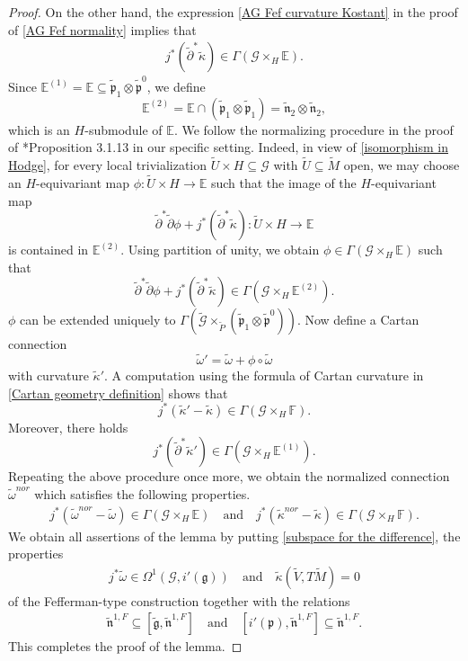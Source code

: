 \documentclass[11pt]{amsart}
\begin{document}
\begin{proof}
On the other hand, the expression \eqref{AG Fef curvature Kostant} in the proof of \cref{AG Fef normality} implies that
\begin{align}\label{space of nonnormality}    j^*(\tilde\partial^*\tilde\kappa)\in\Gamma(\mathcal G\times_{H}\mathbb E).
\end{align}
Since $\mathbb E^{(1)}=\mathbb E\subseteq\tilde{\mathfrak p}_1\otimes\tilde{\mathfrak p}^0$, we define 
\[\mathbb E^{(2)}=\mathbb E\cap(\tilde{\mathfrak p}_1\otimes\tilde{\mathfrak p}_1)=\tilde{\mathfrak n}_2\otimes\tilde{\mathfrak n}_2,\]
which is an $H$-submodule of $\mathbb E$. We follow the normalizing procedure in the proof of \cite{Book}*{Proposition 3.1.13} in our specific setting. Indeed, in view of \eqref{isomorphism in Hodge}, for every local trivialization $\tilde U\times H\subseteq\mathcal G$ with $\tilde U\subseteq\tilde M$ open, we may choose an $H$-equivariant map $\phi:\tilde U\times H\to\mathbb E$ such that the image of the $H$-equivariant map 
\[\tilde\partial^*\tilde\partial\phi
+j^*(\tilde\partial^*\tilde\kappa):
\tilde U\times H\to\mathbb E\]
is contained in $\mathbb E^{(2)}$. Using partition of unity, we obtain $\phi\in\Gamma(\mathcal G\times_H\mathbb E)$ such that
\[\tilde\partial^*\tilde\partial\phi
+j^*(\tilde\partial^*\tilde\kappa)\in\Gamma(\mathcal G\times_H\mathbb E^{(2)}).\]
$\phi$ can be extended uniquely to $\Gamma(\tilde{\mathcal G}\times_{\tilde P}(\tilde{\mathfrak p}_1\otimes\tilde{\mathfrak p}^0))$. Now define a Cartan connection
\[\tilde\omega'=\tilde\omega+\phi\circ\tilde\omega\] with curvature $\tilde\kappa'$. A computation using the formula of Cartan curvature in \cref{Cartan geometry definition} shows that
\[j^*(\tilde\kappa'-\tilde\kappa)\in\Gamma(\mathcal G\times_H\mathbb F).\]
Moreover, there holds
\[j^*(\tilde\partial^*\tilde\kappa')\in\Gamma(\mathcal G\times_H\mathbb E^{(1)}).\]
Repeating the above procedure once more, we obtain the normalized connection $\tilde\omega^{nor}$ which satisfies the following properties. 
\begin{align}\label{subspace for the difference}
j^*(\tilde\omega^{nor}-\tilde\omega)\in\Gamma(\mathcal G\times_H\mathbb E)
\quad\text{and}\quad
j^*(\tilde\kappa^{nor}-\tilde\kappa)\in\Gamma(\mathcal G\times_H\mathbb F).
\end{align}
We obtain all assertions of the lemma by putting \eqref{subspace for the difference}, the properties
\begin{align*}
j^*\tilde\omega\in\Omega^1(\mathcal G,i'(\mathfrak g))
\quad\text{and}\quad
\tilde\kappa(\tilde V,T\tilde M)=0    
\end{align*}
of the Fefferman-type construction together with the relations
\begin{align*}
   \tilde{\mathfrak n}^{1,F}\subseteq [\tilde{\mathfrak g},\tilde{\mathfrak n}^{1,F}]
   \quad\text{and}\quad
   [i'(\mathfrak p),\tilde{\mathfrak n}^{1,F}]\subseteq\tilde{\mathfrak n}^{1,F}.
\end{align*}
This completes the proof of the lemma.
\end{proof}
\end{document}

